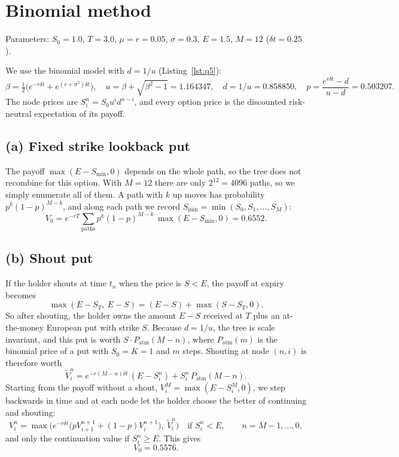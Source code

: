 \documentclass[11pt,a4paper]{article}
\begin{document}
\section{Binomial method}

Parameters: $S_0 = 1.0$, $T = 3.0$, $\mu = r = 0.05$, $\sigma = 0.3$, $E = 1.5$, $M = 12$
($\delta t = 0.25$).

We use the binomial model with $d = 1/u$ (Listing~\ref{lst:q5}):
\[
  \beta = \tfrac12\big(e^{-r\delta t} + e^{(r+\sigma^2)\delta t}\big), \quad
  u = \beta + \sqrt{\beta^2 - 1} = 1.164347, \quad
  d = 1/u = 0.858850, \quad
  p = \frac{e^{r\delta t} - d}{u - d} = 0.503207 .
\]
The node prices are $S_i^n = S_0 u^i d^{n-i}$, and every option price is the discounted
risk-neutral expectation of its payoff.

\subsection*{(a) Fixed strike lookback put}

The payoff $\max(E - S_{\min}, 0)$ depends on the whole path, so the tree does not recombine for
this option. With $M = 12$ there are only $2^{12} = 4096$ paths, so we simply enumerate all of
them. A path with $k$ up moves has probability $p^k(1-p)^{M-k}$, and along each path we record
$S_{\min} = \min(S_0, S_1, \dots, S_M)$:
\[
  V_0 = e^{-rT} \sum_{\text{paths}} p^{k}(1-p)^{M-k}\,\max(E - S_{\min}, 0) = \mathbf{0.6552}.
\]

\subsection*{(b) Shout put}

If the holder shouts at time $t_n$ when the price is $S < E$, the payoff at expiry becomes
\[
  \max(E - S_T,\ E - S) = (E - S) + \max(S - S_T, 0).
\]
So after shouting, the holder owns the amount $E - S$ received at $T$ plus an at-the-money
European put with strike $S$. Because $d = 1/u$, the tree is scale invariant, and this put is
worth $S \cdot P_{\text{atm}}(M - n)$, where $P_{\text{atm}}(m)$ is the binomial price of a put
with $S_0 = K = 1$ and $m$ steps. Shouting at node $(n, i)$ is therefore worth
\[
  \tilde V_i^n = e^{-r(M-n)\delta t}\,(E - S_i^n) + S_i^n\, P_{\text{atm}}(M - n).
\]
Starting from the payoff without a shout, $V_i^M = \max(E - S_i^M, 0)$, we step backwards in time
and at each node let the holder choose the better of continuing and shouting:
\[
  V_i^n = \max\!\Big( e^{-r\delta t}\big(p V_{i+1}^{n+1} + (1-p) V_i^{n+1}\big),\
  \tilde V_i^n \Big) \quad \text{if } S_i^n < E, \qquad n = M-1, \dots, 0,
\]
and only the continuation value if $S_i^n \ge E$. This gives
\[
  V_0 = \mathbf{0.5576}.
\]
\end{document}
